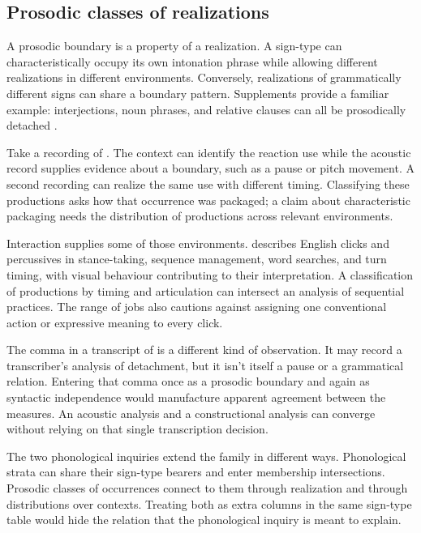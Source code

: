 \documentclass[12pt]{article}
\begin{document}
\subsection{Prosodic classes of realizations}

A prosodic boundary is a property of a realization. A sign-type can
characteristically occupy its own intonation phrase while allowing different
realizations in different environments. Conversely, realizations of
grammatically different signs can share a boundary pattern. Supplements
provide a familiar example: interjections, noun phrases, and relative
clauses can all be prosodically detached
\citep[66, 1350]{HuddlestonPullum2002}.

Take a recording of . The
context can identify the reaction use while the acoustic record supplies
evidence about a boundary, such as a pause or pitch movement. A
second recording can realize the same use with different timing.
Classifying these productions asks how that occurrence was packaged;
a claim about characteristic packaging needs the distribution of
productions across relevant environments.

Interaction supplies some of those environments. \textcite{ogden2013clicks} describes English
clicks and percussives in stance-taking, sequence management, word searches,
and turn timing, with visual behaviour contributing to their interpretation. A classification of productions by timing and
articulation can intersect an analysis of sequential practices.
The range of jobs also cautions against assigning one conventional action
or expressive meaning to every click.

The comma in a transcript of 
is a different kind of observation. It may record a transcriber's
analysis of detachment, but it isn't itself a pause or a grammatical
relation. Entering that comma once as a prosodic boundary and again
as syntactic independence would manufacture apparent agreement between
the measures. An acoustic analysis and a constructional analysis can
converge without relying on that single transcription decision.

The two phonological inquiries extend the family in different ways. Phonological strata can share their sign-type bearers and
enter membership intersections. Prosodic classes of occurrences connect
to them through realization and through distributions over contexts.
Treating both as extra columns in the same sign-type table would hide
the relation that the phonological inquiry is meant to explain.
\end{document}
